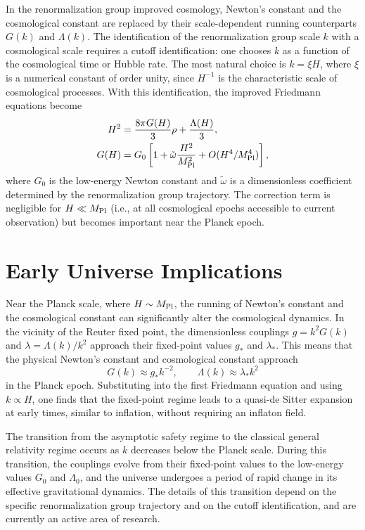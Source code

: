 \documentclass[11pt, twoside, openright]{book}
\theoremstyle{dotted}
\theoremstyle{definition}
\begin{document}
In the renormalization group improved cosmology, Newton's constant and the
cosmological constant are replaced by their scale-dependent running counterparts
$G(k)$ and $\Lambda(k)$. The identification of the renormalization group scale $k$
with a cosmological scale requires a cutoff identification: one chooses $k$ as a
function of the cosmological time or Hubble rate. The most natural choice is
$k = \xi H$, where $\xi$ is a numerical constant of order unity, since $H^{-1}$
is the characteristic scale of cosmological processes. With this identification,
the improved Friedmann equations become
\begin{align}
  H^2 &= \frac{8\pi G(H)}{3}\rho + \frac{\Lambda(H)}{3},
  \label{eq:improved_friedmann} \\
  G(H) &= G_0 \left[1 + \tilde\omega \frac{H^2}{M_{\rm Pl}^2} + O(H^4/M_{\rm Pl}^4)\right],
  \label{eq:G_running}
\end{align}
where $G_0$ is the low-energy Newton constant and $\tilde\omega$ is a
dimensionless coefficient determined by the renormalization group trajectory. The
correction term is negligible for $H \ll M_{\rm Pl}$ (i.e., at all cosmological
epochs accessible to current observation) but becomes important near the Planck
epoch.

\section{Early Universe Implications}

Near the Planck scale, where $H \sim M_{\rm Pl}$, the running of Newton's constant
and the cosmological constant can significantly alter the cosmological dynamics.
In the vicinity of the Reuter fixed point, the dimensionless couplings $g = k^2 G(k)$
and $\lambda = \Lambda(k)/k^2$ approach their fixed-point values $g_*$ and $\lambda_*$.
This means that the physical Newton's constant and cosmological constant approach
\begin{equation}
  G(k) \approx g_* k^{-2}, \qquad \Lambda(k) \approx \lambda_* k^2
  \label{eq:couplings_at_fp}
\end{equation}
in the Planck epoch. Substituting into the first Friedmann equation and using
$k \propto H$, one finds that the fixed-point regime leads to a quasi-de Sitter
expansion at early times, similar to inflation, without requiring an inflaton field.

The transition from the asymptotic safety regime to the classical general relativity
regime occurs as $k$ decreases below the Planck scale. During this transition, the
couplings evolve from their fixed-point values to the low-energy values $G_0$ and
$\Lambda_0$, and the universe undergoes a period of rapid change in its effective
gravitational dynamics. The details of this transition depend on the specific
renormalization group trajectory and on the cutoff identification, and are currently
an active area of research.
\end{document}
